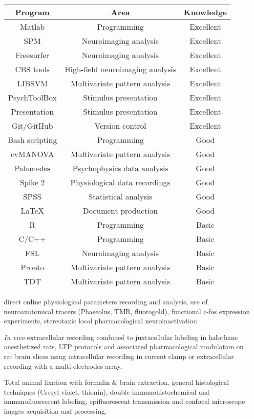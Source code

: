 \begin{center}
\begin{tabular}[c]{|c|c|c|}
\hline\hline
Program         & Area                              & Knowledge \\
\hline
Matlab          & Programming                       & Excellent \\
SPM             & Neuroimaging analysis             & Excellent \\
Freesurfer      & Neuroimaging analysis             & Excellent \\
CBS tools       & High-field neuroimaging analysis  & Excellent \\
LIBSVM          & Multivariate pattern analysis     & Excellent \\
PsychToolBox    & Stimulus presentation             & Excellent \\
Presentation    & Stimulus presentation             & Excellent \\
Git/GitHub      & Version control                   & Excellent \\
Bash scripting  & Programming                       & Good \\
cvMANOVA        & Multivariate pattern analysis     & Good \\
Palamedes       & Psychophysics data analysis       & Good \\
Spike 2         & Physiological data recordings     & Good \\
SPSS            & Statistical analysis              & Good \\
\LaTeX          & Document production               & Good \\
R               & Programming                       & Basic \\
C/C++           & Programming                       & Basic \\
FSL             & Neuroimaging analysis             & Basic \\
Pronto          & Multivariate pattern analysis     & Basic \\
TDT             & Multivariate pattern analysis     & Basic \\
\hline\hline
\end{tabular}
\end{center}

 direct online physiological parameters recording and analysis, use of neuroanatomical tracers (Phaseolus, TMR, fluorogold), functional c-fos expression experiments, stereotaxic local pharmacological neuroinactivation.

 \textit{In vivo} extracellular recording combined to juxtacellular labeling in halothane anesthetized rats, LTP protocols and associated pharmacological modulation on rat brain slices using intracellular recording in current clamp or extracellular recording with a multi-electrodes array.

 Total animal fixation with formalin \& brain extraction, general histological techniques (Cresyl violet, thionin), double immunohistochemical and immunofluorescent labeling, epifluorescent transmission and confocal microscope images acquisition and processing.
